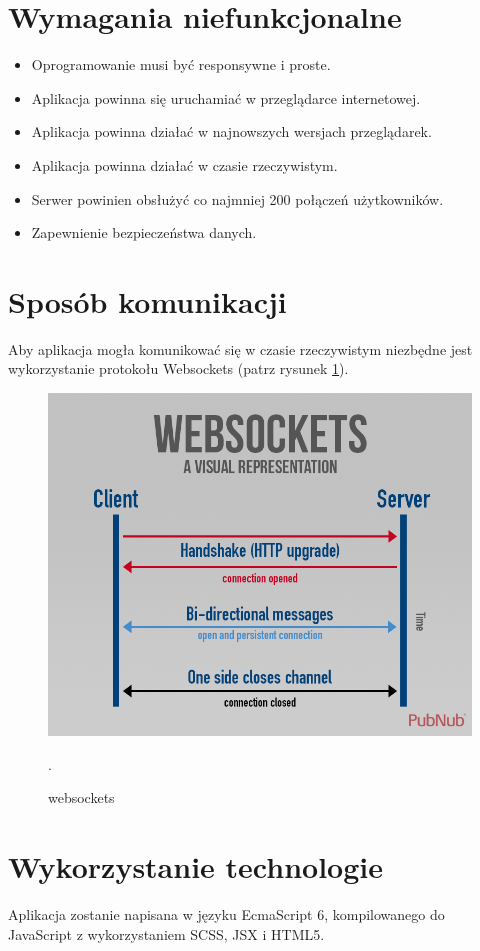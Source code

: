 \section{Wymagania niefunkcjonalne}

\begin{itemize}
    \item Oprogramowanie musi być responsywne i proste.
    \item Aplikacja powinna się uruchamiać w przeglądarce internetowej.
    \item Aplikacja powinna działać w najnowszych wersjach przeglądarek.
    \item Aplikacja powinna działać w czasie rzeczywistym.
    \item Serwer powinien obsłużyć co najmniej 200 połączeń użytkowników.
    \item Zapewnienie bezpieczeństwa danych.
\end{itemize}

\section{Sposób komunikacji}

Aby aplikacja mogła komunikować się w czasie rzeczywistym niezbędne jest wykorzystanie
protokołu Websockets (patrz rysunek \ref{rys:websocket}).

\begin{figure}[H]
	\centering\includegraphics[width=.6\textwidth]{img/websocket}
	\caption{websockets}.
	\label{rys:websocket}
\end{figure}

\section{Wykorzystanie technologie}

Aplikacja zostanie napisana w języku EcmaScript 6, kompilowanego do JavaScript
z wykorzystaniem SCSS, JSX i HTML5.

